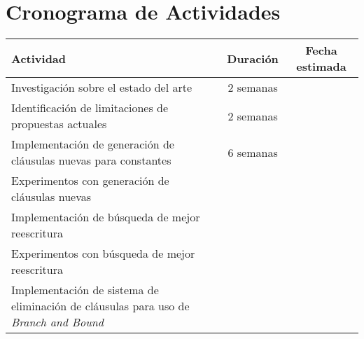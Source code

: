 \section{Cronograma de Actividades}

\begin{tabular}{|p{8cm}|c|c|}
\hline
Actividad & Duración & Fecha estimada \\
\hline
Investigación sobre el estado del arte & 2 semanas & \\
Identificación de limitaciones de propuestas actuales & 2 semanas \\
Implementación de generación de cláusulas nuevas para constantes & 6 semanas & \\
Experimentos con generación de cláusulas nuevas & & \\
Implementación de búsqueda de mejor reescritura & & \\
Experimentos con búsqueda de mejor reescritura & & \\
Implementación de sistema de eliminación de cláusulas para uso de
\emph{Branch and Bound} & & \\
\hline
\end{tabular}
